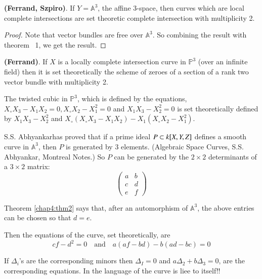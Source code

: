 \setcounter{THM}{1}
\begin{THM}\label{chap4:thm2}
{\bf (Ferrand, Szpiro)}. If $Y=\mathbb{A}^3$, the affine 3-space, then
curves which are local complete intersections are set theoretic
complete intersection with multiplicity 2.
\end{THM}

\begin{proof}
Note that vector bundles are free over $\mathbb{A}^3$. So combining
the result with theorem~ 1, we get the result.
\end{proof}

\begin{THM}\label{chap4:thm3}
{\bf (Ferrand)}. If $X$ is a locally complete intersection curve in
$\mathbb{P}^3$ (over an infinite field) then it is set theoretically
the scheme of zeroes of a section of a rank two vector bundle with
multiplicity 2.
\end{THM}

\begin{Example*}
The twisted cubic in $\mathbb{P}^3$, which is defined by the
equations, $X_\circ X_3-X_1X_2=0, X_\circ X_2-X_1^2=0$ and
$X_1X_3-X_2^2=0$ is set theoretically defined by $X_1X_3-X_2^2$ and
$X_\circ (X_\circ X_3-X_1X_2)-X_1(X_\circ X_2-X_1^2)$. 
\end{Example*}

\begin{REM*}
S.S. Abhyankar\pageoriginale has proved that if a prime ideal
$P\subset k[X,\break Y,Z]$ defines a smooth curve in $\mathbb{A}^3$, then $P$
is generated by 3 elements. (Algebraic Space Curves, S.S. Abhyankar,
Montreal Notes.) So $P$ can be generated by the $2\times 2$
determinants of a $3\times 2$ matrix:
\begin{equation*}
\begin{pmatrix}
a & b\\
c & d\\
e & f
\end{pmatrix}
\end{equation*} 

Theorem \ref{chap4:thm2} says that, after an automorphism of
$\mathbb{A}^3$, the above entries can be chosen so that $d=e$.

Then the equations of the curve, set theoretically, are 
$$
cf -d^2=0\quad\text{and}\quad a(af-bd)-b(ad-bc)=0
$$

If $\Delta_i$'s are the corresponding minors then $\Delta_I=0$ and
$a\Delta_2 +b\Delta_3=0$, are the corresponding equations. In the
language of \cite{key11} the curve is liee to itself!!
\end{REM*}

